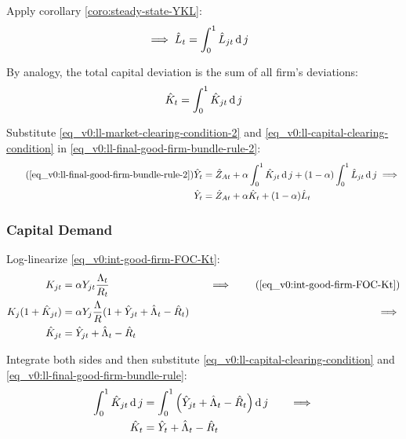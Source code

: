 \documentclass[
thesis.tex
]{subfiles}
\begin{document}
	Apply corollary \ref{coro:steady-state-YKL}:
	\begin{align}
		\implies \hat{L}_t &= \int_{0}^{1} \hat{L}_{jt} \operatorname{d} j \label{eq_v0:ll-market-clearing-condition-2}
	\end{align}
	
	By analogy, the total capital deviation is the sum of all firm's deviations:
	\begin{align}
		\hat{K}_t = \int_{0}^{1} \hat{K}_{jt} \operatorname{d} j \label{eq_v0:ll-capital-clearing-condition}
	\end{align}
	
	Substitute \ref{eq_v0:ll-market-clearing-condition-2} and \ref{eq_v0:ll-capital-clearing-condition} in \ref{eq_v0:ll-final-good-firm-bundle-rule-2}:
	\begin{align}
		\tag{\ref{eq_v0:ll-final-good-firm-bundle-rule-2}}
		\hat{Y}_t &= \hat{Z}_{At} + \alpha \int_{0}^{1} \hat{K}_{jt} \dif j + (1-\alpha) \int_{0}^{1} \hat{L}_{jt} \dif j \implies \\
		\hat{Y}_t &= \hat{Z}_{At} + \alpha \hat{K}_t + (1-\alpha) \hat{L}_t \label{eq_v0:ll-final-good-firm-bundle-rule-3}
	\end{align}
	
	
	\subsubsection*{Capital Demand}
	
	Log-linearize \ref{eq_v0:int-good-firm-FOC-Kt}:
	\begin{alignat}{2}
		K_{jt} &= \alpha Y_{jt} \frac{\Lambda_t}{R_t} &\implies \tag{\ref{eq_v0:int-good-firm-FOC-Kt}} \\
		K_j (1+ \hat{K}_{jt}) &= \alpha Y_{j} \frac{\Lambda}{R} (1+ \hat{Y}_{jt} + \hat{\Lambda}_t - \hat{R}_t) \quad &\implies \nonumber \\
		\hat{K}_{jt} &= \hat{Y}_{jt} + \hat{\Lambda}_t - \hat{R}_t \nonumber
	\end{alignat}
	
	Integrate both sides and then substitute \ref{eq_v0:ll-capital-clearing-condition} and \ref{eq_v0:ll-final-good-firm-bundle-rule}:
	\begin{alignat}{2}
		\int_{0}^{1} \hat{K}_{jt} \operatorname{d} j &= \int_{0}^{1} \left( \hat{Y}_{jt} + \hat{\Lambda}_t - \hat{R}_t \right) \operatorname{d} j \quad &\implies \nonumber \\
		\hat{K}_t &= \hat{Y}_t + \hat{\Lambda}_t - \hat{R}_t \label{eq_v0:ll-int-good-firm-FOC-Kt}
	\end{alignat}
	
\end{document}

